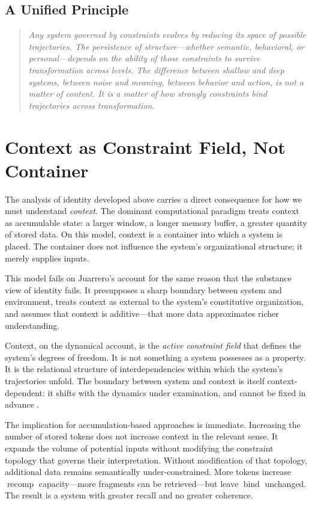 \documentclass[11pt]{article}
\newcommand{\bind}{\operatorname{bind}}
\newcommand{\recomp}{\operatorname{recomp}}
\begin{document}
\subsection{A Unified Principle}

\begin{quote}
\itshape
Any system governed by constraints evolves by reducing its space of possible trajectories.
The persistence of structure—whether semantic, behavioral, or personal—depends on the
ability of those constraints to survive transformation across levels. The difference
between shallow and deep systems, between noise and meaning, between behavior and action,
is not a matter of content. It is a matter of how strongly constraints bind trajectories
across transformation.
\end{quote}

\section{Context as Constraint Field, Not Container}

The analysis of identity developed above carries a direct consequence for how we must
understand \emph{context}. The dominant computational paradigm treats context as
accumulable state: a larger window, a longer memory buffer, a greater quantity of stored
data. On this model, context is a container into which a system is placed. The container
does not influence the system's organizational structure; it merely supplies inputs.

This model fails on Juarrero's account for the same reason that the substance view of
identity fails. It presupposes a sharp boundary between system and environment, treats
context as external to the system's constitutive organization, and assumes that
context is additive—that more data approximates richer understanding.

Context, on the dynamical account, is the \emph{active constraint field} that defines
the system's degrees of freedom. It is not something a system possesses as a property.
It is the relational structure of interdependencies within which the system's trajectories
unfold. The boundary between system and context is itself context-dependent: it shifts
with the dynamics under examination, and cannot be fixed in advance \citep{clark1997,varela1991}.

The implication for accumulation-based approaches is immediate. Increasing the number of
stored tokens does not increase context in the relevant sense. It expands the volume of
potential inputs without modifying the constraint topology that governs their interpretation.
Without modification of that topology, additional data remains semantically under-constrained.
More tokens increase $\recomp$ capacity—more fragments can be retrieved—but leave $\bind$
unchanged. The result is a system with greater recall and no greater coherence.
\end{document}
